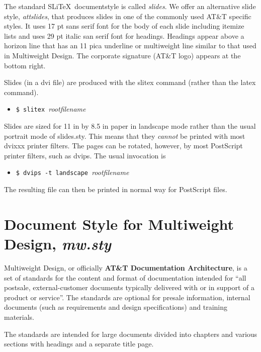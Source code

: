The standard SLi\TeX\ documentstyle is called {\it slides}.  We offer
an alternative slide style, {\it attslides}, that produces slides in
one of the commonly used AT\&T specific styles.  It uses 17 pt sans
serif font for the body of each slide including itemize lists and uses
29 pt italic san serif font for headings.  Headings appear above a
horizon line that has an 11 pica underline or multiweight line similar
to that used in Multiweight Design.  The corporate signature (AT\&T
logo) appears at the bottom right.

Slides (in a dvi file) are produced with the slitex command (rather
than the latex command). 
\begin{itemize}
\item[]
\verb|$ slitex |{\it rootfilename}
\end{itemize}

Slides are sized for 11 in by 8.5 in paper in landscape mode rather
than the usual portrait mode of slides.sty.  This means that they
{\it cannot} be printed with most dvixxx printer filters.  The pages
can be rotated, however, by most PostScript printer filters, such as
dvips.  The usual invocation is
\begin{itemize}
\item[]
\verb|$ dvips -t landscape |{\it rootfilename}
\end{itemize}
The resulting file can then be printed in normal way for PostScript files.

\part{Document Style for Multiweight Design, {\it mw.sty}}
Multiweight Design, or officially {\bf
AT\&T Documentation Architecture}\cite{bib:mwstd}, is a set of standards
for the content and format of documentation intended for ``all
postsale, external-customer documents typically delivered with or in
support of a product or service''.  The standards are optional for
presale information, internal documents (such as requirements and
design specifications) and training materials.

The standards are intended for large documents divided into chapters
and various sections with headings and a separate title page.  

